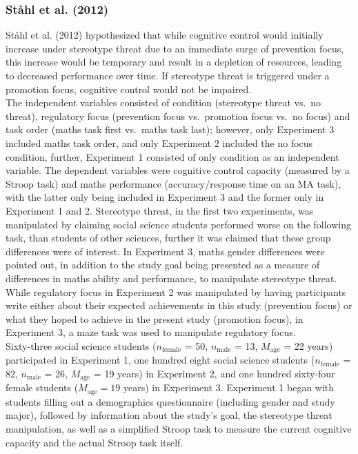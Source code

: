 \documentclass[
  stu,floatsintext]{apa7}
\begin{document}
\subsubsection{Ståhl et al. (2012)}\label{stahlrolepreventionfocus2012}

Ståhl et al. (2012) hypothesized that while cognitive control would initially increase under stereotype threat due to an immediate surge of prevention focus, this increase would be temporary and result in a depletion of resources, leading to decreased performance over time.
If stereotype threat is triggered under a promotion focus, cognitive control would not be impaired.\\
The independent variables consisted of condition (stereotype threat vs.~no threat), regulatory focus (prevention focus vs.~promotion focus vs.~no focus) and task order (maths task first vs.~maths task last); however, only Experiment 3 included maths task order, and only Experiment 2 included the no focus condition, further, Experiment 1 consisted of only condition as an independent variable.
The dependent variables were cognitive control capacity (measured by a Stroop task) and maths performance (accuracy/response time on an MA task), with the latter only being included in Experiment 3 and the former only in Experiment 1 and 2.
Stereotype threat, in the first two experiments, was manipulated by claiming social science students performed worse on the following task, than students of other sciences, further it was claimed that these group differences were of interest.
In Experiment 3, maths gender differences were pointed out, in addition to the study goal being presented as a measure of differences in maths ability and performance, to manipulate stereotype threat.
While regulatory focus in Experiment 2 was manipulated by having participants write either about their expected achievements in this study (prevention focus) or what they hoped to achieve in the present study (promotion focus), in Experiment 3, a maze task was used to manipulate regulatory focus.\\
Sixty-three social science students (\(n_{\text{female}}\) = 50, \(n_{\text{male}}\) = 13, \(M_{\text{age}}\) = 22 years) participated in Experiment 1, one hundred eight social science students (\(n_{\text{female}}\) = 82, \(n_{\text{male}}\) = 26, \(M_{\text{age}}\) = 19 years) in Experiment 2, and one hundred sixty-four female students (\(M_{\text{age}} = 19\) years) in Experiment 3.
Experiment 1 began with students filling out a demographics questionnaire (including gender and study major), followed by information about the study's goal, the stereotype threat manipulation, as well as a simplified Stroop task to measure the current cognitive capacity and the actual Stroop task itself.
\end{document}

